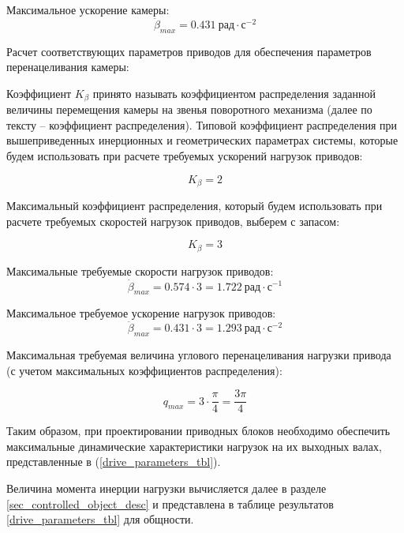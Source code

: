 Максимальное ускорение камеры:
\begin{equation}
    \ddot{\beta}_{max} = 0.431 ~\textit{рад} \cdot \textit{с}^{-2}
\end{equation}

Расчет соответствующих параметров приводов для обеспечения параметров перенацеливания камеры:

Коэффициент $ K_{\beta} $  принято называть коэффициентом распределения заданной величины перемещения камеры на
звенья поворотного механизма (далее по тексту – коэффициент распределения).
Типовой коэффициент распределения при вышеприведенных инерционных и геометрических параметрах
системы, которые будем использовать при расчете требуемых ускорений нагрузок приводов:

\begin{equation}
    K_{\beta} = 2
\end{equation}

Максимальный коэффициент распределения, который будем использовать при расчете требуемых скоростей
нагрузок приводов, выберем с запасом:

\begin{equation}
    K_{\beta} = 3
\end{equation}

Максимальные требуемые скорости нагрузок приводов:
\begin{equation}
    \dot{\beta}_{max} = 0.574 \cdot 3 = 1.722 ~\textit{рад} \cdot \textit{с}^{-1}
\end{equation}

Максимальное требуемое ускорение нагрузок приводов:
\begin{equation}
    \ddot{\beta}_{max} = 0.431 \cdot 3 = 1.293 ~\textit{рад} \cdot \textit{с}^{-2}
\end{equation}

Максимальная требуемая величина углового перенацеливания нагрузки привода (с учетом максимальных
коэффициентов распределения):

\begin{equation}
    q_{max} = 3 \cdot \frac{\pi}{4} = \frac{3 \pi}{4}
\end{equation}

Таким образом, при проектировании приводных блоков необходимо обеспечить максимальные динамические
характеристики нагрузок на их выходных валах, представленные в (\ref{drive_parameters_tbl}).

Величина момента инерции нагрузки вычисляется далее в разделе \ref{sec_controlled_object_desc}
и представлена в таблице результатов \ref{drive_parameters_tbl} для общности.

